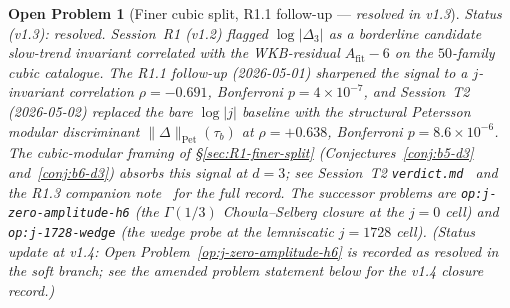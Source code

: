 \documentclass[11pt,a4paper]{article}
\newtheorem{problem}{Open Problem}
\theoremstyle{definition}
\theoremstyle{remark}
\begin{document}
\begin{problem}[Finer cubic split, R1.1
follow-up --- \emph{resolved in v1.3}]\label{op:finer-cubic-split}
\emph{Status (v1.3): resolved.}
Session~R1 (v1.2) flagged $\log|\Delta_{3}|$ as a borderline
candidate slow-trend invariant correlated with the WKB-residual
$A_{\mathrm{fit}}-6$ on the $50$-family cubic catalogue. The R1.1
follow-up (2026-05-01) sharpened the signal to a $j$-invariant
correlation $\rho=-0.691$, Bonferroni $p=4\times 10^{-7}$, and
Session~T2 (2026-05-02) replaced the bare $\log|j|$ baseline with
the structural Petersson modular discriminant
$\|\Delta\|_{\mathrm{Pet}}(\tau_b)$ at $\rho=+0.638$, Bonferroni
$p=8.6\times 10^{-6}$. The cubic-modular framing of
\S\ref{sec:R1-finer-split} (Conjectures~\ref{conj:b5-d3}
and~\ref{conj:b6-d3}) absorbs this signal at $d=3$; see
Session~T2 \texttt{verdict.md}~\cite{Papanokechi2026T2} and the R1.3
companion note~\cite{Papanokechi2026R13} for the full record. The
successor problems are \texttt{op:j-zero-amplitude-h6} (the
$\Gamma(1/3)$ Chowla--Selberg closure at the $j=0$ cell) and
\texttt{op:j-1728-wedge} (the wedge probe at the lemniscatic
$j=1728$ cell).
(Status update at v1.4: Open Problem~\ref{op:j-zero-amplitude-h6} is
recorded as resolved in the soft branch; see the amended problem
statement below for the v1.4 closure record.)
\end{problem}
\end{document}
